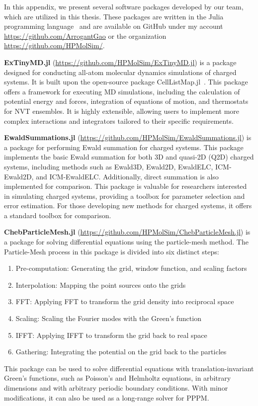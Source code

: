 In this appendix, we present several software packages developed by our team, which are utilized in this thesis. These packages are written in the Julia programming language~\cite{Bezanson_Julia_A_fresh_2017} and are available on GitHub under my account \url{https://github.com/ArrogantGao} or the organization \url{https://github.com/HPMolSim/}.

\textbf{ExTinyMD.jl} (\url{https://github.com/HPMolSim/ExTinyMD.jl}) is a package designed for conducting all-atom molecular dynamics simulations of charged systems. It is built upon the open-source package CellListMap.jl~\cite{MARTINEZ2022108452}. This package offers a framework for executing MD simulations, including the calculation of potential energy and forces, integration of equations of motion, and thermostats for NVT ensembles. It is highly extensible, allowing users to implement more complex interactions and integrators tailored to their specific requirements.

\textbf{EwaldSummations.jl} (\url{https://github.com/HPMolSim/EwaldSummations.jl}) is a package for performing Ewald summation for charged systems. This package implements the basic Ewald summation for both 3D and quasi-2D (Q2D) charged systems, including methods such as Ewald3D, Ewald2D, EwaldELC, ICM-Ewald2D, and ICM-EwaldELC. Additionally, direct summation is also implemented for comparison. This package is valuable for researchers interested in simulating charged systems, providing a toolbox for parameter selection and error estimation. For those developing new methods for charged systems, it offers a standard toolbox for comparison.

\textbf{ChebParticleMesh.jl} (\url{https://github.com/HPMolSim/ChebParticleMesh.jl}) is a package for solving differential equations using the particle-mesh method. The Particle-Mesh process in this package is divided into six distinct steps:
\begin{enumerate}
    \item Pre-computation: Generating the grid, window function, and scaling factors
    \item Interpolation: Mapping the point sources onto the grids
    \item FFT: Applying FFT to transform the grid density into reciprocal space
    \item Scaling: Scaling the Fourier modes with the Green's function
    \item IFFT: Applying IFFT to transform the grid back to real space
    \item Gathering: Integrating the potential on the grid back to the particles
\end{enumerate}
This package can be used to solve differential equations with translation-invariant Green's functions, such as Poisson's and Helmholtz equations, in arbitrary dimensions and with arbitrary periodic boundary conditions. With minor modifications, it can also be used as a long-range solver for PPPM.